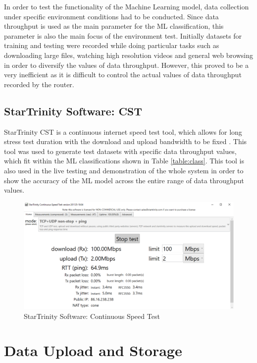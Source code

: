 In order to test the functionality of the Machine Learning model, data collection under specific environment conditions had to be conducted. Since data throughput is used as the main parameter for the ML classification, this parameter is also the main focus of the environment test. Initially datasets for training and testing were recorded while doing particular tasks such as downloading large files, watching high resolution videos and general web browsing in order to diversify the values of data throughput. However, this proved to be a very inefficient as it is difficult to control the actual values of data throughput recorded by the router. 

\subsection{StarTrinity Software: CST}

StarTrinity CST is a continuous internet speed test tool, which allows for long stress test duration with the download and upload bandwidth to be fixed \cite{CST}. This tool was used to generate test datasets with specific data throughput values, which fit within the ML classifications shown in Table \ref{table:class}. This tool is also used in the live testing and demonstration of the whole system in order to show the accuracy of the ML model across the entire range of data throughput values. 

\begin{figure} [ht]
    \centering
    \includegraphics[width=1\linewidth]{pages/Chapter5/Chapter 5 images/CST.PNG}
    \caption{StarTrinity Software: Continuous Speed Test}
    \label{fig_CST}
\end{figure}

\section{Data Upload and Storage}

